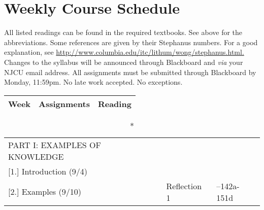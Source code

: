 \documentclass[article,oneside]{memoir}
\begin{document}
\section{Weekly Course Schedule}
All listed readings can be found in the required textbooks. See above for the abbreviations. Some references are given by their Stephanus numbers. For a good explanation, see \href{http://www.columbia.edu/itc/lithum/wong/stephanus.html}{http://www.columbia.edu/itc/lithum/wong/stephanus.html.
} 
 Changes to the syllabus will be announced through Blackboard and \emph{via} your NJCU email address.  All assignments must be submitted through Blackboard by Monday, 11:59pm. No late work accepted. No exceptions.   \newline
						


\newpage
\begin{center}
\begin{longtable}{p{6cm}p{3cm}p{5cm}} 
  \toprule
  \textbf{Week} &\textbf{Assignments} & \textbf{Reading} \\
  \midrule
\end{longtable}
\end{center} 
\vspace{-1.5cm}

\begin{center}
\begin{longtable}{p{6cm}p{3cm}p{5cm}}
 
\caption*{PART I: EXAMPLES OF KNOWLEDGE	} \\

[1.] Introduction	(9/4)	  			& 	 			&   \\


[2.] Examples (9/10)				& 	Reflection 1			& --142a-151d \\
\end{longtable}
\end{center} 
\vspace{-1.5cm}
\end{document}

